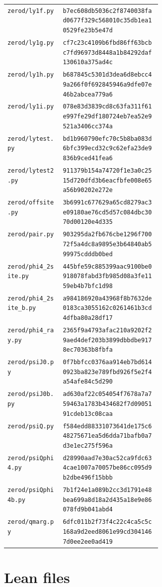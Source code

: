 \documentclass[11pt]{article}
\begin{document}
{\begin{longtable}{@{}p{0.36\linewidth}l@{}}
\texttt{zerod/ly1f.py} & \texttt{b7ec608db5036c2f8740038fad0677f329c568010c35db1ea10529fe23b5e47d}\\
\texttt{zerod/ly1g.py} & \texttt{cf7c23c4109b6fbd86ff63bcbc7fd96973d8448a1b84292daf130610a375ad4c}\\
\texttt{zerod/ly1h.py} & \texttt{b687845c5301d3dea6d8ebcc49a266f0f692845946a9dfe07e46b2abcea779a6}\\
\texttt{zerod/ly1i.py} & \texttt{078e83d3839cd8c63fa311f61e997fe29df180724eb7ea52e9521a3406cc374a}\\
\texttt{zerod/lytest.py} & \texttt{bd1b960790efc70c5b8ba083d6bfc399ecd32c9c62efa23de9836b9ced41fea6}\\
\texttt{zerod/lytest2.py} & \texttt{911379b154a74720f1e3a0c2515d720dfd3b6eacfbfe008e65a56b90202e272e}\\
\texttt{zerod/offsite.py} & \texttt{3b6991c677629a65cd8279ac3e09180ae76cd5d57c084dbc3070d00120e4d335}\\
\texttt{zerod/pair.py} & \texttt{903295da2fb676cbe1296f70072f5a4dc8a9895e3b64840ab599975cdddb0bed}\\
\texttt{zerod/phi4\_2site.py} & \texttt{445bfe59c885399aac9100be0918078fabd3fb985d08a3fe1159eb4b7bfc1d98}\\
\texttt{zerod/phi4\_2site\_b.py} & \texttt{a984186920a43968f8b7632de0183ca3055162c0261461b3cd4dfba80a28df17}\\
\texttt{zerod/phi4\_ray.py} & \texttt{2365f9a4793afac210a9202f29aed4def203b3899dbbdbe9178ec70363b8fbfa}\\
\texttt{zerod/psiJ0.py} & \texttt{0f7bbfcc0376aa914eb7bd6140923ba823e789fbd926f5e2f4a54afe84c5d290}\\
\texttt{zerod/psiJ0b.py} & \texttt{ad630af22c054054f7678a7a759463a1783b434682f7d0905191cdeb13c08caa}\\
\texttt{zerod/psiQ.py} & \texttt{f584edd88331073641de175c648275671ea5d6dda71bafb0a7d3e1ec275f596a}\\
\texttt{zerod/psiQphi4.py} & \texttt{d28990aad7e30ac52ca9fdc634cae1007a70057be86cc095d9b2dbe496f15bbb}\\
\texttt{zerod/psiQphi4b.py} & \texttt{7b1f24e1a089b2cc3d1791e48bea699a8d18a2d435a18e9e86078fd9b041abd4}\\
\texttt{zerod/qmarg.py} & \texttt{6dfc011b2f73f4c22c4ca5c5c168a9d2eed8061e99cd3041467d0ee2ee0ad419}\\
\bottomrule
\end{longtable}
}

\section{Lean files}\label{sec:lean}
\end{document}
